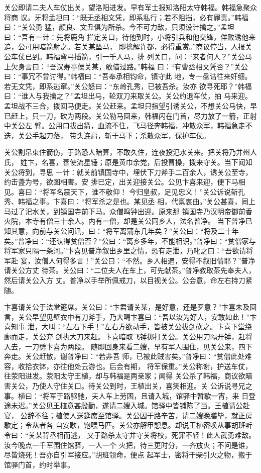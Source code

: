 关公即请二夫人车仗出关，望洛阳进发。早有军士报知洛阳太守韩福。韩福急聚众将商
议。牙将孟坦曰：“既无丞相文凭，即系私行；若不阻挡，必有罪责。”韩福曰：“关公勇
猛，颜良、文丑俱为所杀。今不可力敌，只须设计擒之。”孟坦曰：“吾有一计：先将鹿角
拦定关口，待他到时，小将引兵和他交锋，佯败诱他来追，公可用暗箭射之。若关某坠马，
即擒解许都，必得重赏。”商议停当，人报关公车仗已到。韩福弯弓插箭，引一千人马，排
列关口，问：“来者何人？”关公马上欠身言曰：“吾汉寿亭侯关某，敢借过路。”韩福
曰：“有曹丞相文凭否？”关公曰：“事冗不曾讨得。”韩福曰：“吾奉承相钧命，镇守此
地，专一盘诘往来奸细。若无文凭，即系逃窜。”关公怒曰：“东岭孔秀，已被吾杀。汝亦
欲寻死耶？”韩福曰：“谁人与我擒之？”孟坦出马，轮双刀来取关公。关公约退车仗，拍
马来迎。孟坦战不三合，拨回马便走。关公赶来。孟坦只指望引诱关公，不想关公马快，早
已赶上，只一刀，砍为两段。关公勒马回来，韩福闪在门首，尽力放了一箭，正射中关公左
臂。公用口拔出箭，血流不住，飞马径奔韩福，冲散众军，韩福急走不迭，关公手起刀落，
带头连肩，斩于马下；杀散众军，保护车仗。

关公割帛束住箭伤，于路恐人暗算，不敢久住，连夜投汜水关来。把关将乃并州人氏，
姓卞，名喜，善使流星锤；原是黄巾余党，后投曹操，拨来守关。当下闻知关公将到，寻思
一计：就关前镇国寺中，埋伏下刀斧手二百余人，诱关公至寺，约击盏为号，欲图相害。安
排已定，出关迎接关公。公见卞喜来迎，便下马相见。喜曰：“将军名震天下，谁不敬仰！
今归皇叔，足见忠义！”关公诉说斩孔秀、韩福之事。卞喜曰：“将军杀之是也。某见丞
相，代禀衷曲。”关公甚喜，同上马过了汜水关，到镇国寺前下马。众僧鸣钟出迎。原来那
镇国寺乃汉明帝御前香火院，本寺有僧三十余人。内有一僧，却是关公同乡人，法名普净。
当下普净已知其意，向前与关公问讯，曰：“将军离蒲东几年矣？”关公曰：“将及二十年
矣。”普净曰：“还认得贫僧否？”公曰：“离乡多年，不能相识。”普净曰：“贫僧家与
将军家只隔一条河。”卞喜见普净叙出乡里之情，恐有走泄，乃叱之曰：“吾欲请将军赴
宴，汝僧人何得多言！”关公曰：“不然。乡人相遇，安得不叙旧情耶？”普净请关公方丈
待茶。关公曰：“二位夫人在车上，可先献茶。”普净教取茶先奉夫人，然后请关公入方
丈。普净以手举所佩戒刀，以目视关公。公会意，命左右持刀紧随。

卞喜请关公于法堂筵席。关公曰：“卞君请关某，是好意，还是歹意？”卞喜未及回
言，关公早望见壁衣中有刀斧手，乃大喝卞喜曰：“吾以汝为好人，安敢如此！”卞喜知事
泄，大叫：“左右下手！”左右方欲动手，皆被关公拔剑砍之。卞喜下堂绕廊而走，关公弃
剑执大刀来赶。卞喜暗取飞锤掷打关公。关公用刀隔开锤，赶将入去，一刀劈卞喜为两段。
随即回身来看二嫂，早有军人围住，见关公来，四下奔走。关公赶散，谢普净曰：“若非吾
师，已被此贼害矣。”普净曰：“贫僧此处难容，收拾衣钵，亦往他处云游也。后会有期，
将军保重。”关公称谢，护送车仗，往荥阳进发。荥阳太守王植，却与韩福是两亲家；闻得
关公杀了韩福，商议欲暗害关公，乃使人守住关口。待关公到时，王植出关，喜笑相迎。关
公诉说寻兄之事。植曰：“将军于路驱驰，夫人车上劳困，且请入城，馆驿中暂歇一宵，来
日登途未迟。”关公见王植意甚殷勤，遂请二嫂入城。馆驿中皆铺陈了当。王植请公赴宴，
公辞不往；植使人送筵席至馆驿。关公因于路辛苦，请二嫂晚膳毕，就正房歇定；令从者各
自安歇，饱喂马匹。关公亦解甲憩息。却说王植密唤从事胡班听令曰：“关某背丞相而逃，
又于路杀太守并守关将校，死罪不轻！此人武勇难敌。汝今晚点一千军围住馆驿，一人一个
火把，待三更时分，一齐放火；不问是谁，尽皆烧死！吾亦自引军接应。”胡班领命，便点
起军士，密将干柴引火之物，搬于馆驿门首，约时举事。

